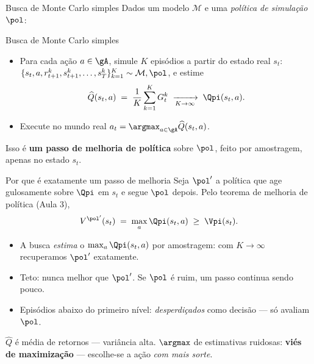 \documentclass[aspectratio=169, 11pt]{beamer}
\newcommand{\Mmod}{\mathcal{M}}                 %
\newcommand{\Qh}{\widehat{Q}}                   %
\newcommand{\ret}{G}                            %
\begin{document}
\begin{frame}{Busca de Monte Carlo simples}
  Dados um modelo $\Mmod$ e uma \emph{política de simulação} $\pol$:

  \vspace{-10pt}
  \begin{algbox}{Busca de Monte Carlo simples}
    \begin{itemize}\setlength{\itemsep}{0.1ex}
      \item Para cada ação $a \in \gA$, simule $K$ episódios a partir do estado
            real $s_t$:
            $\{s_t, a, r^k_{t+1}, s^k_{t+1}, \dots, s^k_T\}_{k=1}^{K}
             \sim \Mmod, \pol$, e estime
            \[
              \Qh(s_t,a) \;=\; \frac{1}{K}\sum_{k=1}^{K} \ret^k_t
              \;\xrightarrow[K\to\infty]{}\; \Qpi(s_t,a).
            \]
      \item Execute no mundo real $\displaystyle a_t = \argmax_{a\in\gA} \Qh(s_t,a)$.
    \end{itemize}
  \end{algbox}

  \pause
  \begin{ideiabox}
    Isso é \textbf{um passo de melhoria de política} sobre $\pol$, feito por amostragem, apenas no estado $s_t$.
  \end{ideiabox}
\end{frame}

\begin{frame}{Por que é exatamente um passo de melhoria}
  Seja $\pol'$ a política que age gulosamente sobre $\Qpi$ em $s_t$ e segue
  $\pol$ depois. Pelo teorema de melhoria de política (Aula 3),
  \[
    V^{\pol'}(s_t) \;=\; \max_{a} \Qpi(s_t,a) \;\ge\; \Vpi(s_t).
  \]

  \pause
  \begin{itemize}
    \item A busca \emph{estima} o $\max_a \Qpi(s_t,a)$ por amostragem: com $K\to\infty$ recuperamos $\pol'$ exatamente.
    \item Teto: nunca melhor que $\pol'$. Se $\pol$ é ruim, um passo continua sendo pouco.
    \item Episódios abaixo do primeiro nível: \emph{desperdiçados} como decisão — só avaliam $\pol$.
  \end{itemize}

  \pause
  \begin{alertabox}
    $\Qh$ é média de retornos --- variância alta. $\argmax$ de estimativas ruidosas: \textbf{viés de maximização} — escolhe-se a ação \emph{com mais sorte}.
  \end{alertabox}
\end{frame}
\end{document}
